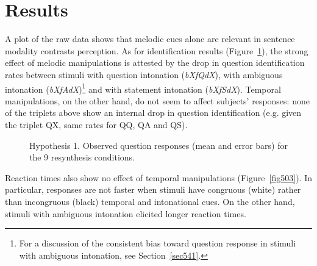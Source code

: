 \section{Results}\label{sec53}
A plot of the raw data shows that melodic cues alone are relevant in sentence modality contrasts perception.
As for identification results (Figure~\ref{fig502}), the strong effect of melodic manipulations is attested by the drop in question identification rates between stimuli with question intonation (\textit{bXfQdX}), with ambiguous intonation (\textit{bXfAdX})\footnote{For a discussion of the consistent bias toward question response in stimuli with ambiguous intonation, see Section~\ref{sec541}.} and with statement intonation (\textit{bXfSdX}). Temporal manipulations, on the other hand, do not seem to affect subjects' responses: none of the triplets above show an internal drop in question identification (e.g. given the triplet QX, same rates for QQ, QA and QS).
\begin{figure}
\centering
{}
\caption{Hypothesis 1. Observed question responses (mean and error bars) for the 9 resynthesis conditions.}
\label{fig502}\end{figure}
Reaction times also show no effect of temporal manipulations (Figure~\ref{fig503}). In particular, responses are not faster when stimuli have congruous (white) rather than incongruous (black) temporal and intonational cues. On the other hand, stimuli with ambiguous intonation elicited longer reaction times.
